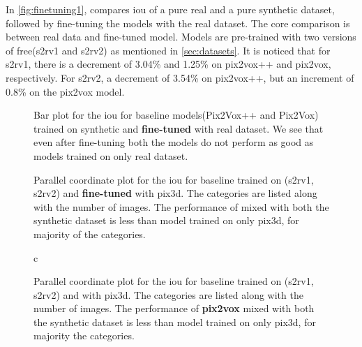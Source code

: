 In \autoref{fig:finetuning1}, compares \gls{iou} of a pure real and a pure synthetic dataset, followed by fine-tuning the models with the real dataset.
The core comparison is between real data and fine-tuned model.
Models are pre-trained with two versions of \gls{free}(\gls{s2rv1} and \gls{s2rv2}) as mentioned in \autoref{sec:datasets}.
It is noticed that for \gls{s2rv1}, there is a decrement of 3.04\% and 1.25\% on pix2vox++ and pix2vox, respectively.
For \gls{s2rv2}, a decrement of 3.54\% on pix2vox++, but an increment of 0.8\% on the pix2vox model.

\begin{figure}[ht]
    \centering
    \resizebox{0.75\textwidth}{!}{}
    \caption{Bar plot for the \gls{iou} for baseline models(Pix2Vox++ and Pix2Vox) trained on synthetic and \textbf{fine-tuned} with real dataset.
    We see that even after fine-tuning both the models do not perform as good as models trained on only real dataset.}
    \label{fig:finetuning1}
\end{figure}


\begin{figure}[!ht]
    \centering
    \resizebox{0.7\textwidth}{!}{}
    \caption{Parallel coordinate plot for the \gls{iou} for baseline  trained on (\gls{s2rv1}, \gls{s2rv2}) and \textbf{fine-tuned} with pix3d.
    The categories are listed along with the number of images.
    The performance of  mixed with both the synthetic dataset is less than model trained on only pix3d, for majority of the categories.}
    \label{fig:finetuning2}
\end{figure}

\begin{figure}[!ht]c
    \centering
    \resizebox{0.7\textwidth}{!}{}
    \caption{Parallel coordinate plot for the \gls{iou} for baseline  trained on (\gls{s2rv1}, \gls{s2rv2}) and  with pix3d.
    The categories are listed along with the number of images.
    The performance of \textbf{pix2vox} mixed with both the synthetic dataset is less than model trained on only pix3d, for majority the categories.}
    \label{fig:finetuning3}
\end{figure}

